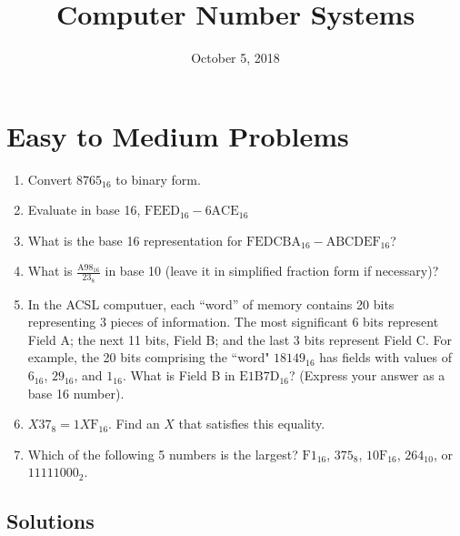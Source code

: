 \documentclass{pset_template}
\title{Computer Number Systems}
\date{October 5, 2018}
\begin{document}
\maketitle

\section{Easy to Medium Problems}
\begin{enumerate}
\item
Convert $8765_{16}$ to binary form.

\item
Evaluate in base 16, $\text{FEED}_{16} - \text{6ACE}_{16}$

\item
What is the base 16 representation for $\text{FEDCBA}_{16} - \text{ABCDEF}_{16}$?

\item
What is $\frac{\text{A98}_{16}}{23_{8}}$ in base 10 (leave it in simplified fraction form if necessary)?

\item
In the ACSL computuer, each ``word'' of memory contains 20 bits representing 3 pieces of information. 
The most significant 6 bits represent Field A; the next 11 bits, Field B; and the last 3 bits represent Field C. 
For example, the 20 bits comprising the ``word" $18149_{16}$ has fields with values of $6_{16}$, $29_{16}$,
and $1_{16}$.
What is Field B in $\text{E1B7D}_{16}$? (Express your answer as a base 16 number).

\item
$X37_{8} = 1X\text{F}_{16}$. Find an $X$ that satisfies this equality.

\item
Which of the following 5 numbers is the largest? 
$\text{F1}_{16}$, $375_{8}$, $\text{10F}_{16}$, $264_{10}$, or $11111000_{2}$.

\end{enumerate}


\subsection{Solutions}
\end{document}
